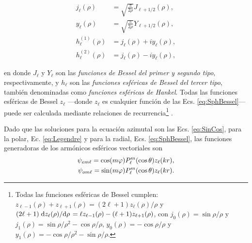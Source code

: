 	\begin{subequations}
	\begin{align}
	j_\ell (\rho) &= \sqrt{\frac{\pi}{2\rho}} J_{\ell+1/2}(\rho), \label{eqs:jn}\\
	y_\ell (\rho) &= \sqrt{\frac{\pi}{2\rho}} Y_{\ell+1/2}(\rho), \label{eqs:yn}\\
	h_\ell^{(1)} (\rho) &= j_\ell(\rho) + i y_\ell(\rho), \label{eqs:h1}\\
	h_\ell^{(2)} (\rho) &=  j_\ell(\rho) - i y_\ell(\rho), \label{eqs:h2}
	\end{align}			\label{eq:SphBessel}
	\end{subequations}

\noindent	
en donde $J_\ell$ y $Y_\ell$ son las \emph{funciones de Bessel del primer y segundo tipo}, respectivamente, y $h_\ell$ son las \emph{funciones esféricas de Bessel del tercer tipo}, también denominadas como \emph{funciones esféricas de Hankel}. Todas las funciones esféricas de Bessel $z_\ell$ ---donde $z_\ell$ es cualquier función de las Ecs. \eqref{eq:SphBessel}--- puede ser calculada mediante relaciones de recurrencia\footnote{Todas las funciones esféricas de Bessel cumplen: $	z_{\ell-1}(\rho) + z_{\ell+1}(\rho) =(2\ell+1)z_\ell(\rho)/\rho$ y $(2\ell + 1) \dv*{z_\ell(\rho)}{\rho} = \ell z_{\ell-1}(\rho) - (\ell+1)z_{\ell+1}(\rho)$, con  $j_0(\rho) = \sin\rho / \rho$ y $j_1(\rho) = \sin\rho / \rho^2- \cos\rho/\rho$, $y_0(\rho) = -\cos\rho/\rho$ y $y_1(\rho) = -\cos\rho/\rho^2-\sin\rho/\rho$.} \cite{arfken2001methods}.

Dado que las soluciones para la ecuación azimutal son las Ecs. \eqref{eq:SinCos}, para la polar, Ec. \eqref{eq:Legendre} y para la radial, Ecs. \eqref{eq:SphBessel}, las funciones generadoras de los armónicos esféricos vectoriales son\begin{subequations}\vspace*{-2em}

	\begin{align}
	\psi_{em\ell} = \cos(m\varphi) P_\ell^m( \cos \theta) z_\ell(k r),\\
	\psi_{om\ell} = \sin(m\varphi) P_\ell^m( \cos \theta) z_\ell(k r).
	\end{align}
	\label{eq:psieo}	\end{subequations}\vspace*{-1em}		

